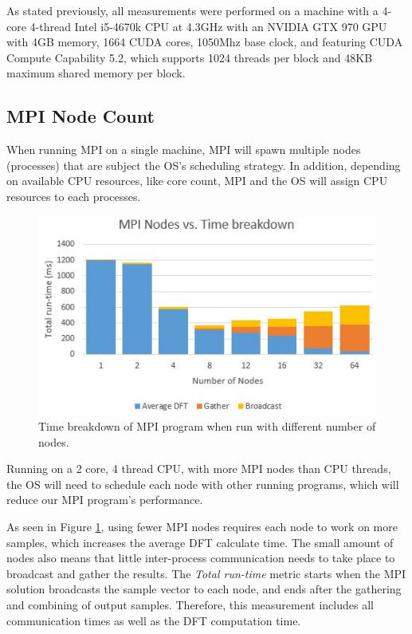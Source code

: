 \documentclass[11pt,a4paper]{article}
\begin{document}
As stated previously, all measurements were performed on a machine with a 4-core 4-thread Intel i5-4670k CPU at 4.3GHz with an NVIDIA GTX 970 GPU with 4GB memory, 1664 CUDA cores, 1050Mhz base clock, and featuring CUDA Compute Capability 5.2, which supports 1024 threads per block and 48KB maximum shared memory per block.

\subsection{MPI Node Count}\label{sect:MPI Node Count}
When running MPI on a single machine, MPI will spawn multiple nodes (processes) that are subject the OS's scheduling strategy. In addition, depending on available CPU resources, like core count, MPI and the OS will assign CPU resources to each processes.

\begin{figure}
\begin{center}
\includegraphics[scale=0.7]{mpi_eval_nodes}
\end{center}
\caption{Time breakdown of MPI program when run with different number of nodes.}
\label{fig:mpi_eval_nodes}
\end{figure}

Running on a 2 core, 4 thread CPU, with more MPI nodes than CPU threads, the OS will need to schedule each node with other running programs, which will reduce our MPI program's performance.

As seen in Figure \ref{fig:mpi_eval_nodes}, using fewer MPI nodes requires each node to work on more samples, which increases the average DFT calculate time. The small amount of nodes also means that little inter-process communication needs to take place to broadcast and gather the results. The \textit{Total run-time} metric starts when the MPI solution broadcasts the sample vector to each node, and ends after the gathering and combining of output samples. Therefore, this measurement includes all communication times as well as the DFT computation time.
\end{document}
